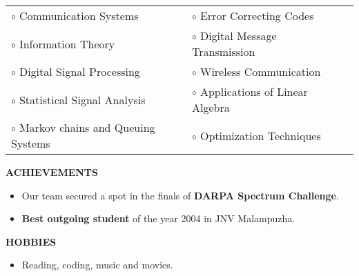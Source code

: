 \documentclass[a4paper,10pt]{article}
\begin{document}
 \begin{tabular}{p{3.5in}p{5in}p{3.5in}}
    $\circ$ Communication Systems		&$\circ$ Error Correcting Codes \\
    $\circ$ Information Theory			&$\circ$ Digital Message Transmission \\
    $\circ$ Digital Signal Processing		&$\circ$ Wireless Communication \\
    $\circ$ Statistical Signal Analysis	&$\circ$ Applications of Linear Algebra \\
    $\circ$ Markov chains and Queuing Systems	&$\circ$ Optimization Techniques \\
\end{tabular}


 \colorbox{titleColor}{\parbox{6.5in}{\textbf{ACHIEVEMENTS}}}

 \begin{itemize}
 \item Our team secured a spot in the finals of \textbf{DARPA Spectrum Challenge}.
 \item \textbf{Best outgoing student} of the year 2004 in JNV Malampuzha.
  \end{itemize}


 \colorbox{titleColor}{\parbox{6.5in}{\textbf{HOBBIES}}}

\begin{itemize}
 \setlength{\itemsep}{1pt}
    \item Reading, coding, music and movies.
  \end{itemize}
\end{document}
